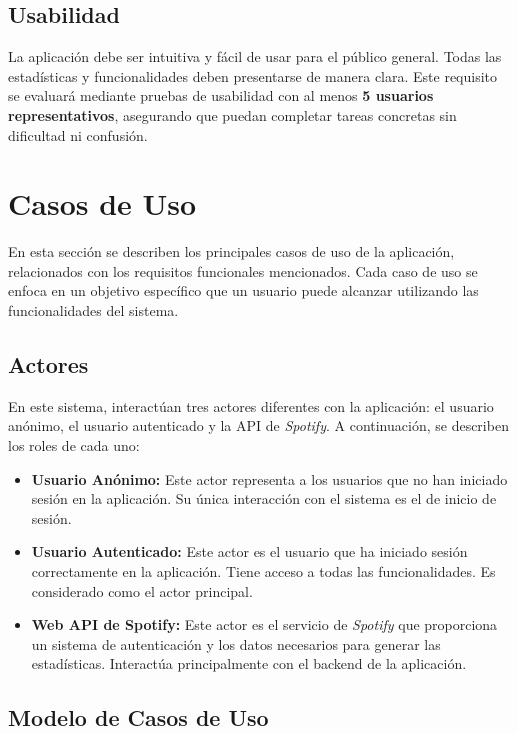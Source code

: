\subsection*{Usabilidad}

La aplicación debe ser intuitiva y fácil de usar para el público general. Todas las estadísticas y funcionalidades deben presentarse de manera clara. Este requisito se evaluará mediante pruebas de usabilidad con al menos \textbf{5 usuarios representativos}, asegurando que puedan completar tareas concretas sin dificultad ni confusión.


\section{Casos de Uso}

En esta sección se describen los principales casos de uso de la aplicación, relacionados con los requisitos funcionales mencionados. Cada caso de uso se enfoca en un objetivo específico que un usuario puede alcanzar utilizando las funcionalidades del sistema.

\subsection{Actores}

En este sistema, interactúan tres actores diferentes con la aplicación: el usuario anónimo, el usuario autenticado y la API de \textit{Spotify}. A continuación, se describen los roles de cada uno:

\begin{itemize}
    \item \textbf{Usuario Anónimo:} Este actor representa a los usuarios que no han iniciado sesión en la aplicación. Su única interacción con el sistema es el de inicio de sesión.
    \item \textbf{Usuario Autenticado:} Este actor es el usuario que ha iniciado sesión correctamente en la aplicación. Tiene acceso a todas las funcionalidades. Es considerado como el actor principal.
    \item \textbf{Web API de Spotify:} Este actor es el servicio de \textit{Spotify} que proporciona un sistema de autenticación y los datos necesarios para generar las estadísticas. Interactúa principalmente con el backend de la aplicación.
\end{itemize}


\subsection{Modelo de Casos de Uso}

